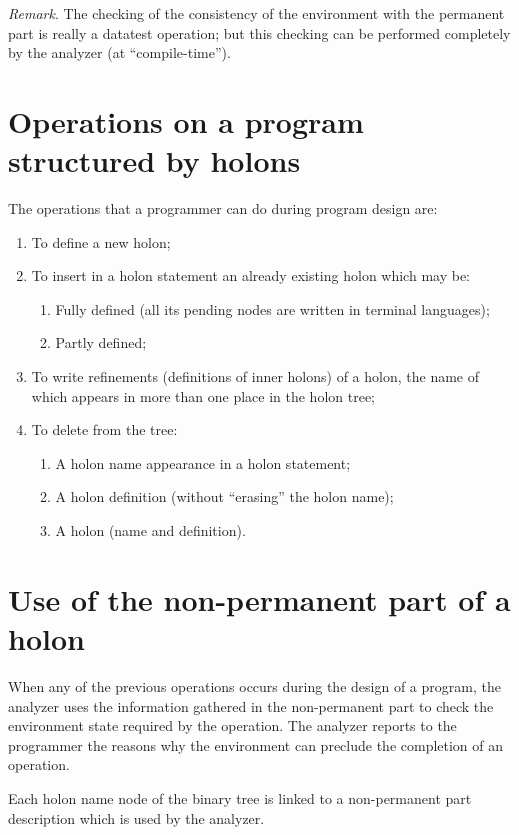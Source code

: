 \documentclass[openany,nobib]{tufte-book}
\begin{document}
\medskip\noindent
{\sl Remark}. The checking of the consistency of the environment with the
permanent part is really a datatest operation; but this checking can be
performed completely by the analyzer (at ``compile-time'').

\section{Operations on a program structured by holons}

The operations that a programmer can do during program design are:
\begin{enumerate}
    \item To define a new holon;
    \item To insert in a holon statement an already existing holon which may
be:
    \begin{enumerate}
        \item Fully defined (all its pending nodes are written in terminal
languages);
        \item Partly defined;
    \end{enumerate}
    \item To write refinements (definitions of inner holons) of a holon, the
name of which appears in more than one place in the holon tree;
    \item To delete from the tree:
    \begin{enumerate}
        \item A holon name appearance in a holon statement;
        \item A holon definition (without ``erasing'' the holon name);
        \item A holon (name and definition).
    \end{enumerate}
\end{enumerate}

\section{Use of the non-permanent part of a holon}

When any of the previous operations occurs during the design of a program, the
analyzer uses the information gathered in the non-permanent part to check the
environment state required by the operation. The analyzer reports to the
programmer the reasons why the environment can preclude the completion of an
operation.

Each holon name node of the binary tree is linked to a non-permanent part
description which is used by the analyzer.
\end{document}
